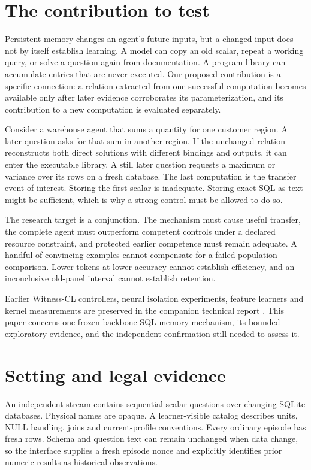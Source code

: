 \documentclass[10pt,twocolumn]{article}
\begin{document}
\section{The contribution to test}
Persistent memory changes an agent's future inputs, but a changed input does not
by itself establish learning. A model can copy an old scalar, repeat a working
query, or solve a question again from documentation. A program library can
accumulate entries that are never executed. Our proposed contribution is a
specific connection: a relation extracted from one successful computation
becomes available only after later evidence corroborates its parameterization,
and its contribution to a new computation is evaluated separately.

Consider a warehouse agent that sums a quantity for one customer region. A
later question asks for that sum in another region. If the unchanged relation
reconstructs both direct solutions with different bindings and outputs, it can
enter the executable library. A still later question requests a maximum or
variance over its rows on a fresh database. The last computation is the
transfer event of interest. Storing the first scalar is inadequate. Storing
exact SQL as text might be sufficient, which is why a strong control must be
allowed to do so.

The research target is a conjunction. The mechanism must cause useful transfer,
the complete agent must outperform competent controls under a declared resource
constraint, and protected earlier competence must remain adequate. A handful of
convincing examples cannot compensate for a failed population comparison. Lower
tokens at lower accuracy cannot establish efficiency, and an inconclusive
old-panel interval cannot establish retention.

Earlier Witness-CL controllers, neural isolation experiments, feature learners
and kernel measurements are preserved in the
companion technical report \citep{mausberg2026technical}. This paper concerns
one frozen-backbone SQL memory mechanism, its bounded exploratory evidence,
and the independent confirmation still needed to assess it.

\section{Setting and legal evidence}
An independent stream contains sequential scalar questions over changing SQLite
databases. Physical names are opaque. A learner-visible catalog describes units,
NULL handling, joins and current-profile conventions. Every ordinary episode has
fresh rows. Schema and question text can remain unchanged when data change, so
the interface supplies a fresh episode nonce and explicitly identifies prior
numeric results as historical observations.
\end{document}
